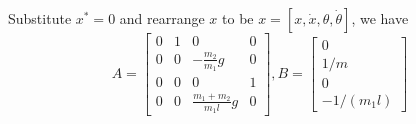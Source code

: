 Substitute  $x^\ast=0$ and rearrange $x$ to be $x=[x,\dot{x},\theta,\dot{\theta}]$, we have
\begin{equation}
    A = \left[ \begin{array}{cccc}
        0 & 1 & 0 & 0 \\ 
        0 & 0 & -\frac{m_2}{m_1}g & 0 \\ 
        0 & 0 & 0 & 1 \\
        0 & 0 & \frac{m_1+m_2}{m_1l}g & 0 
        \end{array} \right], B = \left[ \begin{array}{c}
            0 \\ 
            1/m \\
            0 \\
            -1/(m_1l)
            \end{array} \right]
\end{equation}